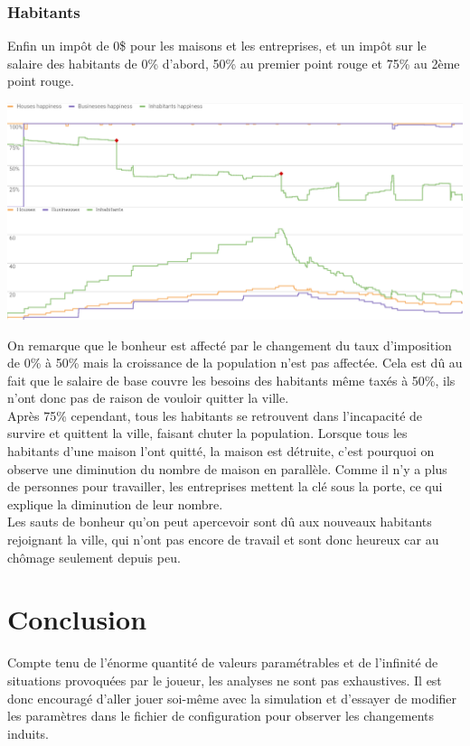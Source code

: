\documentclass[11pt]{report}
\begin{document}
\subsection{Habitants}
Enfin un impôt de 0\$ pour les maisons et les entreprises, et un impôt sur le salaire des habitants de 0\% d'abord, 50\% au premier point rouge et 75\% au 2ème point rouge.
\begin{center}
	\includegraphics[width=\textwidth]{inhabitants_taxes}
\end{center}
On remarque que le bonheur est affecté par le changement du taux d'imposition de 0\% à 50\% mais la croissance de la population n'est pas affectée. Cela est dû au fait que le salaire de base couvre les besoins des habitants même taxés à 50\%, ils n'ont donc pas de raison de vouloir quitter la ville.\\
Après 75\% cependant, tous les habitants se retrouvent dans l'incapacité de survire et quittent la ville, faisant chuter la population. Lorsque tous les habitants d'une maison l'ont quitté, la maison est détruite, c'est pourquoi on observe une diminution du nombre de maison en parallèle. Comme il n'y a plus de personnes pour travailler, les entreprises mettent la clé sous la porte, ce qui explique la diminution de leur nombre.\\
Les sauts de bonheur qu'on peut apercevoir sont dû aux nouveaux habitants rejoignant la ville, qui n'ont pas encore de travail et sont donc heureux car au chômage seulement depuis peu.



\chapter*{Conclusion}
Compte tenu de l'énorme quantité de valeurs paramétrables et de l'infinité de situations provoquées par le joueur, les analyses ne sont pas exhaustives. Il est donc encouragé d'aller jouer soi-même avec la simulation et d'essayer de modifier les paramètres dans le fichier de configuration pour observer les changements induits.
\end{document}
